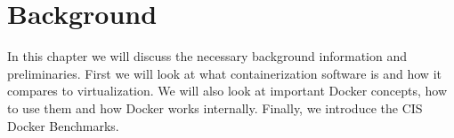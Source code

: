 \chapter{Background}\label{chapter:background}

In this chapter we will discuss the necessary background information and preliminaries. First we will look at what containerization software is and how it compares to virtualization. We will also look at important Docker concepts, how to use them and how Docker works internally. Finally, we introduce the CIS Docker Benchmarks.




